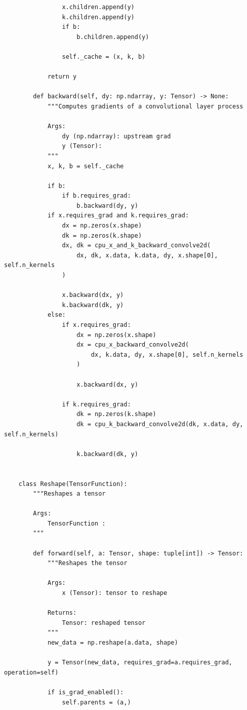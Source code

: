 \documentclass{article}
\begin{document}
\begin{verbatim}
                x.children.append(y)
                k.children.append(y)
                if b:
                    b.children.append(y)

                self._cache = (x, k, b)

            return y

        def backward(self, dy: np.ndarray, y: Tensor) -> None:
            """Computes gradients of a convolutional layer process

            Args:
                dy (np.ndarray): upstream grad
                y (Tensor):
            """
            x, k, b = self._cache

            if b:
                if b.requires_grad:
                    b.backward(dy, y)
            if x.requires_grad and k.requires_grad:
                dx = np.zeros(x.shape)
                dk = np.zeros(k.shape)
                dx, dk = cpu_x_and_k_backward_convolve2d(
                    dx, dk, x.data, k.data, dy, x.shape[0], self.n_kernels
                )

                x.backward(dx, y)
                k.backward(dk, y)
            else:
                if x.requires_grad:
                    dx = np.zeros(x.shape)
                    dx = cpu_x_backward_convolve2d(
                        dx, k.data, dy, x.shape[0], self.n_kernels
                    )

                    x.backward(dx, y)

                if k.requires_grad:
                    dk = np.zeros(k.shape)
                    dk = cpu_k_backward_convolve2d(dk, x.data, dy, self.n_kernels)

                    k.backward(dk, y)


    class Reshape(TensorFunction):
        """Reshapes a tensor

        Args:
            TensorFunction :
        """

        def forward(self, a: Tensor, shape: tuple[int]) -> Tensor:
            """Reshapes the tensor

            Args:
                x (Tensor): tensor to reshape

            Returns:
                Tensor: reshaped tensor
            """
            new_data = np.reshape(a.data, shape)

            y = Tensor(new_data, requires_grad=a.requires_grad, operation=self)

            if is_grad_enabled():
                self.parents = (a,)


\end{verbatim}
\end{document}
